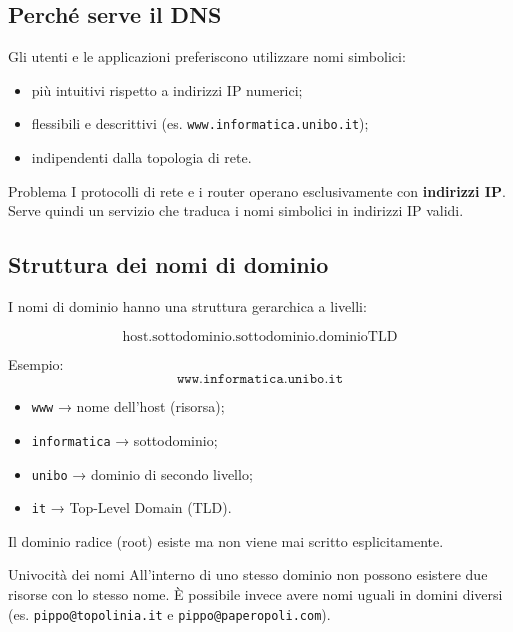 \documentclass[a4paper,12pt]{report}
\begin{document}
\subsection*{Perché serve il DNS}

Gli utenti e le applicazioni preferiscono utilizzare nomi simbolici:

\begin{itemize}
    \item più intuitivi rispetto a indirizzi IP numerici;
    \item flessibili e descrittivi (es. \texttt{www.informatica.unibo.it});
    \item indipendenti dalla topologia di rete.
\end{itemize}

\begin{notebox}{Problema}
I protocolli di rete e i router operano esclusivamente con \textbf{indirizzi IP}.
Serve quindi un servizio che traduca i nomi simbolici in indirizzi IP validi.
\end{notebox}

\newpage
\subsection*{Struttura dei nomi di dominio}

I nomi di dominio hanno una struttura gerarchica a livelli:

\[
\text{host.sottodominio.sottodominio.dominioTLD}
\]

Esempio:  
\[
\texttt{www.informatica.unibo.it}
\]

\begin{itemize}
    \item \texttt{www} → nome dell’host (risorsa);
    \item \texttt{informatica} → sottodominio;
    \item \texttt{unibo} → dominio di secondo livello;
    \item \texttt{it} → Top-Level Domain (TLD).
\end{itemize}

Il dominio radice (root) esiste ma non viene mai scritto esplicitamente.

\begin{notebox}{Univocità dei nomi}
All’interno di uno stesso dominio non possono esistere due risorse con lo stesso nome.
È possibile invece avere nomi uguali in domini diversi
(es. \texttt{pippo@topolinia.it} e \texttt{pippo@paperopoli.com}).
\end{notebox}
\end{document}
